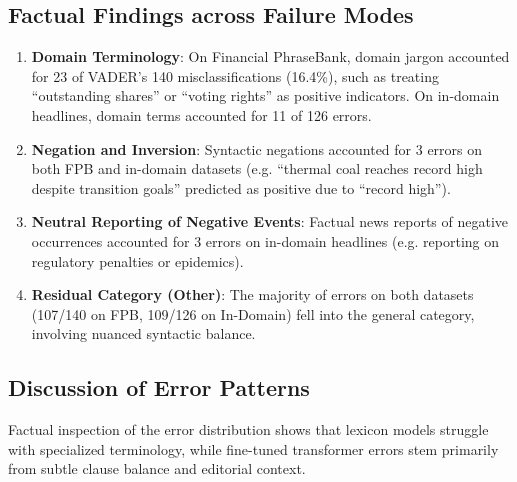 \documentclass[10pt,twocolumn,letterpaper]{article}
\begin{document}
\subsection{Factual Findings across Failure Modes}
\begin{enumerate}
    \item \textbf{Domain Terminology}: On Financial PhraseBank, domain jargon accounted for 23 of VADER's 140 misclassifications (16.4\%), such as treating ``outstanding shares'' or ``voting rights'' as positive indicators. On in-domain headlines, domain terms accounted for 11 of 126 errors.
    \item \textbf{Negation and Inversion}: Syntactic negations accounted for 3 errors on both FPB and in-domain datasets (e.g. ``thermal coal reaches record high despite transition goals'' predicted as positive due to ``record high'').
    \item \textbf{Neutral Reporting of Negative Events}: Factual news reports of negative occurrences accounted for 3 errors on in-domain headlines (e.g. reporting on regulatory penalties or epidemics).
    \item \textbf{Residual Category (Other)}: The majority of errors on both datasets (107/140 on FPB, 109/126 on In-Domain) fell into the general category, involving nuanced syntactic balance.
\end{enumerate}

\subsection{Discussion of Error Patterns}
Factual inspection of the error distribution shows that lexicon models struggle with specialized terminology, while fine-tuned transformer errors stem primarily from subtle clause balance and editorial context.

\noindent{}

\vspace{0.5em}

\noindent{}
\end{document}
